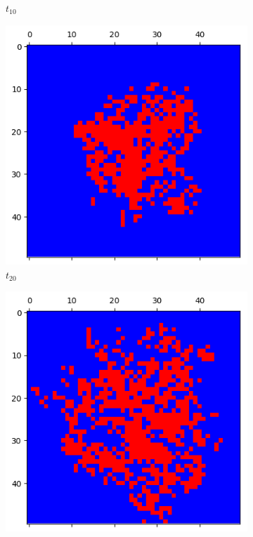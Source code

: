 \documentclass[letterpaper]{article}
\begin{document}
\begin{figure}[H]
\begin{subfigure}{.33\textwidth}
      \caption{$t_{10}$}
    \end{subfigure}
    \begin{subfigure}{.33\textwidth}
      \centering
      \includegraphics[width=1\linewidth]{images/assign2/part32-coop/t20}
      \caption{$t_{20}$}
    \end{subfigure}
    \begin{subfigure}{.33\textwidth}
      \centering
      \includegraphics[width=1\linewidth]{images/assign2/part32-coop/t40}

\end{subfigure}
\end{figure}
\end{document}
